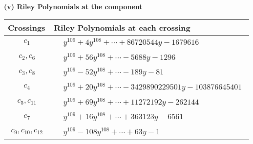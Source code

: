 \documentclass[1p]{elsarticle_modified}
\theoremstyle{definition}
\begin{document}
\flushleft \textbf{(v) Riley Polynomials at the component}\newline \\
\begin{tabular}{m{50pt}|m{274pt}}
Crossings & \hspace{64pt}Riley Polynomials at each crossing \\
\hline $$\begin{aligned}c_{1}\end{aligned}$$&$\begin{aligned}
&y^{109}+4 y^{108}+\cdots+86720544 y-1679616
\end{aligned}$\\
\hline $$\begin{aligned}c_{2},c_{6}\end{aligned}$$&$\begin{aligned}
&y^{109}+56 y^{108}+\cdots-5688 y-1296
\end{aligned}$\\
\hline $$\begin{aligned}c_{3},c_{8}\end{aligned}$$&$\begin{aligned}
&y^{109}-52 y^{108}+\cdots-189 y-81
\end{aligned}$\\
\hline $$\begin{aligned}c_{4}\end{aligned}$$&$\begin{aligned}
&y^{109}+20 y^{108}+\cdots-3429890229501 y-103876645401
\end{aligned}$\\
\hline $$\begin{aligned}c_{5},c_{11}\end{aligned}$$&$\begin{aligned}
&y^{109}+69 y^{108}+\cdots+11272192 y-262144
\end{aligned}$\\
\hline $$\begin{aligned}c_{7}\end{aligned}$$&$\begin{aligned}
&y^{109}+16 y^{108}+\cdots+363123 y-6561
\end{aligned}$\\
\hline $$\begin{aligned}c_{9},c_{10},c_{12}\end{aligned}$$&$\begin{aligned}
&y^{109}-108 y^{108}+\cdots+63 y-1
\end{aligned}$\\
\hline
\end{tabular}\\~\\
\end{document}
